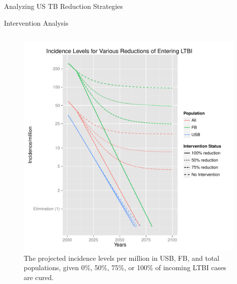 \documentclass[final]{beamer}
\begin{document}
\begin{frame}
\begin{columns}
\begin{column}{.3\textwidth}
\begin{block}{Analyzing US TB Reduction Strategies}
\begin{block}{Intervention Analysis}
\begin{column}{.45\textwidth}
\begin{figure}[h]
\begin{center}
                \includegraphics[scale=1]{incidencePlotRedEnLTBI}
              \end{center}
              \caption{The projected incidence levels per million in
                       USB, FB, and total populations, given 0\%, 50\%, 75\%, or
                       100\% of incoming LTBI cases are cured.}
              \label{fig:redEnLTBI_incidence}
            \end{figure}
          \end{column}
          \begin{column}{.45\textwidth}
            \begin{figure}[h]
              \begin{center}

\end{center}
\end{figure}
\end{column}
\end{block}
\end{block}
\end{column}
\end{columns}
\end{frame}
\end{document}
